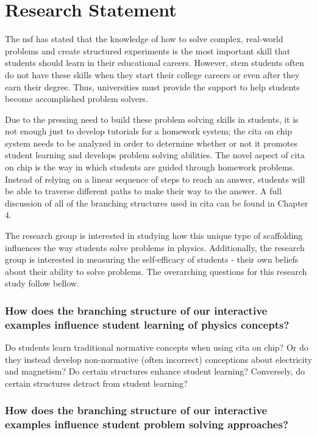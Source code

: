 \section{Research Statement}

The \gls{nsf} has stated that the knowledge of how to solve complex, real-world problems and create structured experiments is the most important skill that students should learn in their educational careers\cite{shaping1996}. However, \gls{stem} students often do not have these skills when they start their college careers or even after they earn their degree. Thus, universities must provide the support to help students become accomplished problem solvers.

Due to the pressing need to build these problem solving skills in students, it is not enough just to develop tutorials for a homework system; the \gls{cita} on \gls{chip} system needs to be analyzed in order to determine whether or not it promotes student learning and develops problem solving abilities. The novel aspect of \gls{cita} on \gls{chip} is the way in which students are guided through homework problems. Instead of relying on a linear sequence of steps to reach an answer, students will be able to traverse different paths to make their way to the answer. A full discussion of all of the branching structures used in \gls{cita} can be found in Chapter 4.

The research group is interested in studying how this unique type of scaffolding influences the way students solve problems in physics. Additionally, the research group is interested in measuring the self-efficacy of students - their own beliefs about their ability to solve problems. The overarching questions for this research study follow bellow.

\subsubsection{How does the branching structure of our interactive examples influence student learning of physics concepts?}

Do students learn traditional normative concepts when using \gls{cita} on \gls{chip}? Or do they instead develop non-normative (often incorrect) conceptions about electricity and magnetism? Do certain structures enhance student learning? Conversely, do certain structures detract from student learning?

\subsubsection{How does the branching structure of our interactive examples influence student problem solving approaches?}

